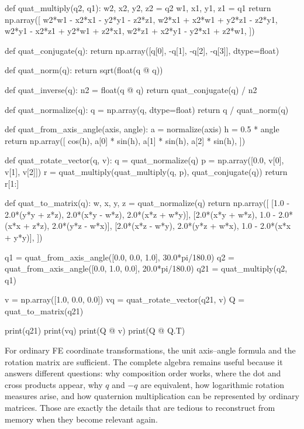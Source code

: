 \begin{python}
def quat_multiply(q2, q1):
    w2, x2, y2, z2 = q2
    w1, x1, y1, z1 = q1
    return np.array([
        w2*w1 - x2*x1 - y2*y1 - z2*z1,
        w2*x1 + x2*w1 + y2*z1 - z2*y1,
        w2*y1 - x2*z1 + y2*w1 + z2*x1,
        w2*z1 + x2*y1 - y2*x1 + z2*w1,
    ])


def quat_conjugate(q):
    return np.array([q[0], -q[1], -q[2], -q[3]], dtype=float)


def quat_norm(q):
    return sqrt(float(q @ q))


def quat_inverse(q):
    n2 = float(q @ q)
    return quat_conjugate(q) / n2


def quat_normalize(q):
    q = np.array(q, dtype=float)
    return q / quat_norm(q)


def quat_from_axis_angle(axis, angle):
    a = normalize(axis)
    h = 0.5 * angle
    return np.array([
        cos(h),
        a[0] * sin(h),
        a[1] * sin(h),
        a[2] * sin(h),
    ])


def quat_rotate_vector(q, v):
    q = quat_normalize(q)
    p = np.array([0.0, v[0], v[1], v[2]])
    r = quat_multiply(quat_multiply(q, p), quat_conjugate(q))
    return r[1:]


def quat_to_matrix(q):
    w, x, y, z = quat_normalize(q)
    return np.array([
        [1.0 - 2.0*(y*y + z*z), 2.0*(x*y - w*z),       2.0*(x*z + w*y)],
        [2.0*(x*y + w*z),       1.0 - 2.0*(x*x + z*z), 2.0*(y*z - w*x)],
        [2.0*(x*z - w*y),       2.0*(y*z + w*x),       1.0 - 2.0*(x*x + y*y)],
    ])


q1 = quat_from_axis_angle([0.0, 0.0, 1.0], 30.0*pi/180.0)
q2 = quat_from_axis_angle([0.0, 1.0, 0.0], 20.0*pi/180.0)
q21 = quat_multiply(q2, q1)

v = np.array([1.0, 0.0, 0.0])
vq = quat_rotate_vector(q21, v)
Q = quat_to_matrix(q21)

print(q21)
print(vq)
print(Q @ v)
print(Q @ Q.T)
\end{python}

\begin{notebooknote}
For ordinary FE coordinate transformations, the unit axis--angle formula and the
rotation matrix are sufficient. The complete algebra remains useful because it
answers different questions: why composition order works, where the dot
and cross products appear, why $q$ and $-q$ are equivalent, how logarithmic
rotation measures arise, and how quaternion multiplication can be represented by
ordinary matrices. Those are exactly the details that are tedious to reconstruct
from memory when they become relevant again.
\end{notebooknote}


